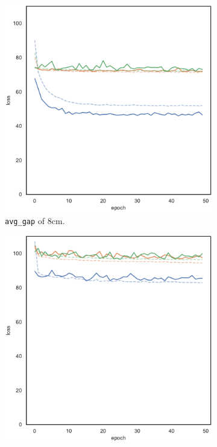 \begin{figure}[!htb]
	\begin{center}
		\begin{subfigure}[h]{0.32\textwidth}
			\includegraphics[width=\textwidth]{contents/images/task1-comm-extension/loss-distributed-gap_8@copy}
			\caption{\texttt{avg\_gap} of $8$\gls{cm}.}
		\end{subfigure}
		\hfill
		\begin{subfigure}[h]{0.32\textwidth}
			\includegraphics[width=\textwidth]{contents/images/task1-comm-extension/loss-distributed-gap_20@copy}%

\end{subfigure}
\end{center}
\end{figure}
